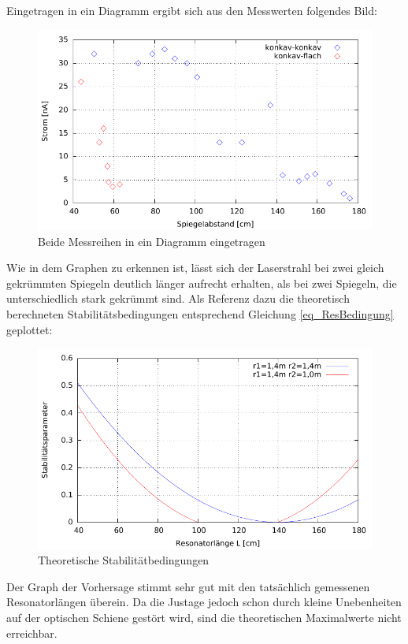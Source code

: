 Eingetragen in ein Diagramm ergibt sich aus den Messwerten folgendes Bild:
\begin{figure}[htbp]
\includegraphics[scale=1]{../gnu/Abstand.pdf}
\caption{Beide Messreihen in ein Diagramm eingetragen}
\label{gra_abstand}
\end{figure}

Wie in dem Graphen zu erkennen ist, lässt sich der Laserstrahl bei zwei gleich gekrümmten Spiegeln deutlich länger aufrecht erhalten, als bei zwei Spiegeln, die unterschiedlich stark gekrümmt sind. Als Referenz dazu die theoretisch berechneten Stabilitätsbedingungen entsprechend Gleichung \eqref{eq_ResBedingung} geplottet:
\begin{figure}[h!]
\includegraphics[scale=1]{../gnu/stabilitaetsparameter.pdf}
\caption{Theoretische Stabilitätbedingungen}
\label{gra_stabil}
\end{figure}

Der Graph der Vorhersage stimmt sehr gut mit den tatsächlich gemessenen Resonatorlängen überein. Da die Justage jedoch schon durch kleine Unebenheiten auf der optischen Schiene gestört wird, sind die theoretischen Maximalwerte nicht erreichbar.

